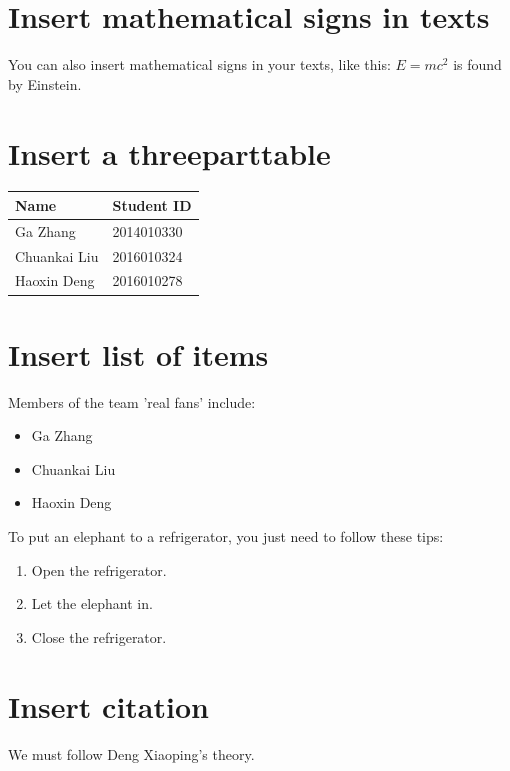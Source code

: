 \documentclass{article} %
\begin{document}
\section{Insert mathematical signs in texts}
You can also insert mathematical signs in your texts, like this: $E=m c^2$ is found by Einstein. 

\section{Insert a threeparttable} 
\begin{table}[H]
\centering
    \begin{threeparttable}
        \begin{tabular}{ll}
        \toprule
        Name         & Student ID \\
        \midrule
        Ga Zhang     & 2014010330 \\
        Chuankai Liu & 2016010324 \\
        Haoxin Deng  & 2016010278 \\
        \bottomrule
        \end{tabular}
    \end{threeparttable}
\end{table}

\section{Insert list of items}
Members of the team 'real fans' include:
\begin{itemize} %

    \item Ga Zhang
    \item Chuankai Liu
    \item Haoxin Deng
\end{itemize}

To put an elephant to a refrigerator, you just need to follow these tips:
\begin{enumerate} %
    \item Open the refrigerator.
    \item Let the elephant in.
    \item Close the refrigerator.
\end{enumerate}

\section{Insert citation}
We must follow Deng Xiaoping's theory. %



\end{document}
